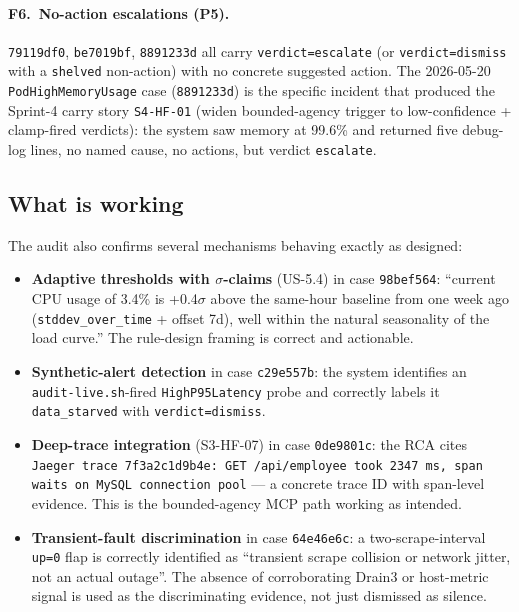 \documentclass[11pt,a4paper,oneside]{report}
\begin{document}
\paragraph{F6.~No-action escalations (P5).}
\texttt{79119df0}, \texttt{be7019bf}, \texttt{8891233d} all carry
\texttt{verdict=escalate} (or \texttt{verdict=dismiss} with a
\texttt{shelved} non-action) with no concrete suggested action.
The 2026-05-20
\texttt{PodHighMemoryUsage} case (\texttt{8891233d}) is the
specific incident that produced the Sprint-4 carry story
\texttt{S4-HF-01} (widen bounded-agency trigger to low-confidence
+ clamp-fired verdicts): the system saw memory at 99.6\% and
returned five debug-log lines, no named cause, no actions, but
verdict \texttt{escalate}.

\subsection{What is working}

The audit also confirms several mechanisms behaving exactly as
designed:

\begin{itemize}
  \item \textbf{Adaptive thresholds with $\sigma$-claims} (US-5.4)
        in case \texttt{98bef564}: ``current CPU usage of 3.4\% is
        +0.4$\sigma$ above the same-hour baseline from one week
        ago (\texttt{stddev\_over\_time} + offset 7d), well within
        the natural seasonality of the load curve.''  The rule-design
        framing is correct and actionable.
  \item \textbf{Synthetic-alert detection} in case
        \texttt{c29e557b}: the system identifies an
        \texttt{audit-live.sh}-fired
        \texttt{HighP95Latency} probe and correctly labels it
        \texttt{data\_starved} with \texttt{verdict=dismiss}.
  \item \textbf{Deep-trace integration} (S3-HF-07) in case
        \texttt{0de9801c}: the RCA cites
        \texttt{Jaeger trace 7f3a2c1d9b4e: GET /api/employee took
        2347 ms, span waits on MySQL connection pool} ---
        a concrete trace ID with span-level evidence.  This is the
        bounded-agency MCP path working as intended.
  \item \textbf{Transient-fault discrimination} in case
        \texttt{64e46e6c}: a two-scrape-interval \texttt{up=0}
        flap is correctly identified as ``transient scrape
        collision or network jitter, not an actual outage''.  The
        absence of corroborating Drain3 or host-metric signal is
        used as the discriminating evidence, not just dismissed
        as silence.
\end{itemize}
\end{document}

